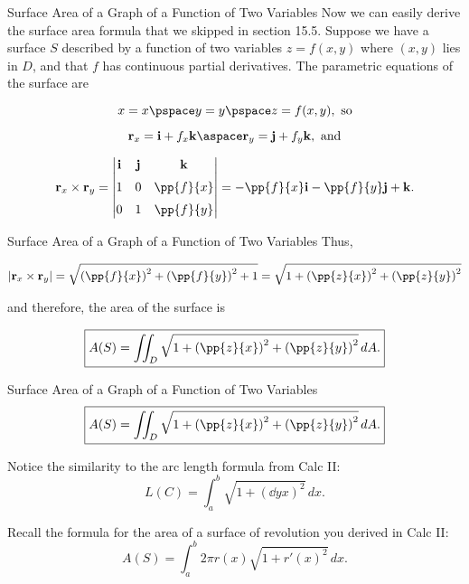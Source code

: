 \documentclass[11pt,english,
handout
]{beamer}
\begin{document}
\begin{frame}[t]{Surface Area of a Graph of a Function of Two Variables}
\small
Now we can easily derive the surface area formula that we skipped in section 15.5. \pause Suppose we have a surface $S$ described by a function of two variables $z=f(x,y)$ where $(x,y)$ lies in $D$, and that $f$ has continuous partial derivatives. \pause The parametric equations of the surface are

\[
x=x\pspace y=y\pspace z=f(x,y),\text{ so}
\]

\[
\mathbf{r}_x=\mathbf{i}+f_x\mathbf{k}\aspace \mathbf{r}_y=\mathbf{j}+f_y\mathbf{k},\text{ and}
\]

\[
\mathbf{r}_x\times\mathbf{r}_y=\begin{vmatrix}\mathbf{i}&\mathbf{j}&\mathbf{k}\\[2mm] 1& 0 & \pp{f}{x}\\[2mm] 0 & 1 & \pp{f}{y}\end{vmatrix}=-\pp{f}{x}\mathbf{i}-\pp{f}{y}\mathbf{j}+\mathbf{k}.
\]
\end{frame}










\begin{frame}[t]{Surface Area of a Graph of a Function of Two Variables}
\small
Thus,

\[
|\mathbf{r}_x\times \mathbf{r}_y|=\sqrt{\left(\pp{f}{x}\right)^2+\left(\pp{f}{y}\right)^2+1}=\sqrt{1+\left(\pp{z}{x}\right)^2+\left(\pp{z}{y}\right)^2}
\]

and therefore, the area of the surface is

\[
\boxed{A(S)=\iint_D\sqrt{1+\left(\pp{z}{x}\right)^2+\left(\pp{z}{y}\right)^2}\,dA.}
\]
\end{frame}











\begin{frame}[t]{Surface Area of a Graph of a Function of Two Variables}
\small
\[
\boxed{A(S)=\iint_D\sqrt{1+\left(\pp{z}{x}\right)^2+\left(\pp{z}{y}\right)^2}\,dA.}
\]

\lspace
Notice the similarity to the arc length formula from Calc II:
\[
L(C)=\int_a^b\sqrt{1+\left(\dd{y}{x}\right)^2}\,dx.
\]\pause


Recall the formula for the area of a surface of revolution you derived in Calc II:
\[
A(S)=\int_a^b2\pi r(x)\sqrt{1+r'(x)^2}\,dx.
\]
\end{frame}
\end{document}
